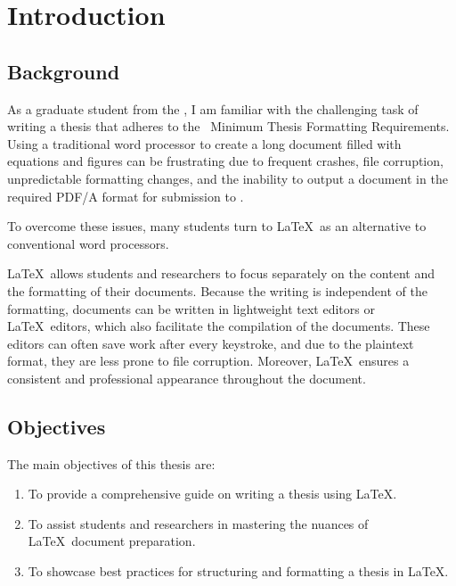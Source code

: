 \chapter{Introduction}\label{ch:Introduction}
	\section{Background}
		As a graduate student from the \University, I am familiar with the challenging task of writing a thesis that adheres to the \Fac\ Minimum Thesis Formatting Requirements. 
		Using a traditional word processor to create a long document filled with equations and figures can be frustrating due to frequent crashes, file corruption, unpredictable formatting changes, and the inability to output a document in the required PDF/A format for submission to \Fac.
		
		To overcome these issues, many students turn to \LaTeX\ as an alternative to conventional word processors. 
		
		\LaTeX\ allows students and researchers to focus separately on the content and the formatting of their documents. 
		Because the writing is independent of the formatting, documents can be written in lightweight text editors or \LaTeX\ editors, which also facilitate the compilation of the documents. 
		These editors can often save work after every keystroke, and due to the plaintext format, they are less prone to file corruption.
		Moreover, \LaTeX\ ensures a consistent and professional appearance throughout the document. 

	\section{Objectives}
		The main objectives of this thesis are:
		\begin{enumerate}
			\item To provide a comprehensive guide on writing a thesis using \LaTeX.
			\item To assist students and researchers in mastering the nuances of \LaTeX\ document preparation.
			\item To showcase best practices for structuring and formatting a thesis in \LaTeX.
		\end{enumerate}

